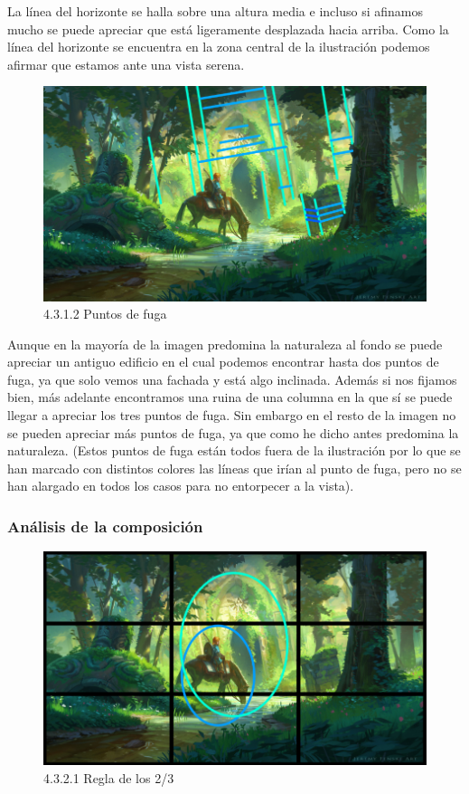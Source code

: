 \documentclass[12pt]{article}
\begin{document}
    La línea del horizonte se halla sobre una altura media e incluso si afinamos mucho se puede apreciar que está ligeramente desplazada hacia arriba. Como la línea del horizonte se encuentra en la zona central de la ilustración podemos afirmar que estamos ante una vista serena.

    \begin{figure}[H]
      \centering
      \includegraphics[scale=0.7]{images/Saúl/Sección 3/EA_img3_1Perspectiva_2PuntosFuga.png}
      \caption{\small 4.3.1.2 Puntos de fuga}
    \end{figure}

    Aunque en la mayoría de la imagen predomina la naturaleza al fondo se puede apreciar un antiguo edificio en el cual podemos encontrar hasta dos puntos de fuga, ya que solo vemos una fachada y está algo inclinada. Además si nos fijamos bien, más adelante encontramos una ruina de una columna en la que sí se puede llegar a apreciar los tres puntos de fuga. Sin embargo en el resto de la imagen no se pueden apreciar más puntos de fuga, ya que como he dicho antes predomina la naturaleza.
(Estos puntos de fuga están todos fuera de la ilustración por lo que se han marcado con distintos colores las líneas que irían al punto de fuga, pero no se han alargado en todos los casos para no entorpecer a la vista).


        \subsubsection{Análisis de la composición}

        
    \begin{figure}[H]
      \centering
      \includegraphics[scale=0.7]{images/Saúl/Sección 3/EA_img3_2Composicion_1Regla2-3.png}
      \caption{\small 4.3.2.1 Regla de los 2/3}
    \end{figure}
\end{document}
